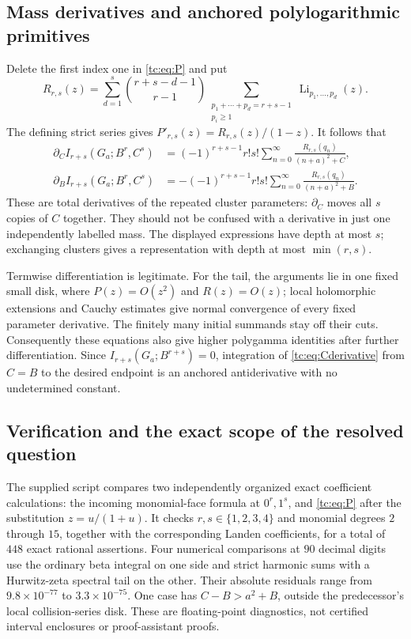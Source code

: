 \documentclass[11pt,a4paper]{article}
\numberwithin{equation}{section}
\theoremstyle{definition}
\theoremstyle{remark}
\begin{document}
\subsection{Mass derivatives and anchored polylogarithmic primitives}

Delete the first index one in \eqref{tc:eq:P} and put
\begin{equation}\label{tc:eq:Rpolylog}
 R_{r,s}(z)=\sum_{d=1}^{s}\binom{r+s-d-1}{r-1}
   \sum_{\substack{p_1+\cdots+p_d=r+s-1\\p_i\ge1}}
                       \operatorname{Li}_{p_1,\ldots,p_d}(z).
\end{equation}
The defining strict series gives
$P'_{r,s}(z)=R_{r,s}(z)/(1-z)$.  It follows that
\begin{align}
 \partial_C I_{r+s}(G_a;B^r,C^s)
   &=(-1)^{r+s-1}r!s!
       \sum_{n=0}^{\infty}
           \frac{R_{r,s}(q_n)}{(n+a)^2+C},\label{tc:eq:Cderivative}\\
 \partial_B I_{r+s}(G_a;B^r,C^s)
   &=-(-1)^{r+s-1}r!s!
       \sum_{n=0}^{\infty}
           \frac{R_{r,s}(q_n)}{(n+a)^2+B}.
                                                     \label{tc:eq:Bderivative}
\end{align}
These are total derivatives of the repeated cluster parameters:
$\partial_C$ moves all $s$ copies of $C$ together.  They should not
be confused with a derivative in just one independently labelled mass.
The displayed expressions have depth at most $s$; exchanging clusters
gives a representation with depth at most $\min(r,s)$.

Termwise differentiation is legitimate.  For the tail, the arguments
lie in one fixed small disk, where $P(z)=O(z^2)$ and $R(z)=O(z)$;
local holomorphic extensions and Cauchy estimates give normal
convergence of every fixed parameter derivative.  The finitely many
initial summands stay off their cuts.  Consequently these equations
also give higher polygamma identities after further differentiation.
Since $I_{r+s}(G_a;B^{r+s})=0$, integration of
\eqref{tc:eq:Cderivative} from $C=B$ to the desired endpoint is an
anchored antiderivative with no undetermined constant.

\subsection{Verification and the exact scope of the resolved question}

The supplied script compares two independently organized exact
coefficient calculations: the incoming monomial-face formula at
$0^r,1^s$, and \eqref{tc:eq:P} after the substitution
$z=u/(1+u)$.  It checks $r,s\in\{1,2,3,4\}$ and monomial degrees
$2$ through $15$, together with the corresponding Landen
coefficients, for a total of $448$ exact rational assertions.
Four numerical comparisons at $90$ decimal digits use the ordinary
beta integral on one side and strict harmonic sums with a
Hurwitz-zeta spectral tail on the other.  Their absolute residuals
range from $9.8\times10^{-77}$ to $3.3\times10^{-75}$.
One case has $C-B>a^2+B$, outside the predecessor's local
collision-series disk.  These are floating-point diagnostics,
not certified interval enclosures or proof-assistant proofs.
\end{document}
